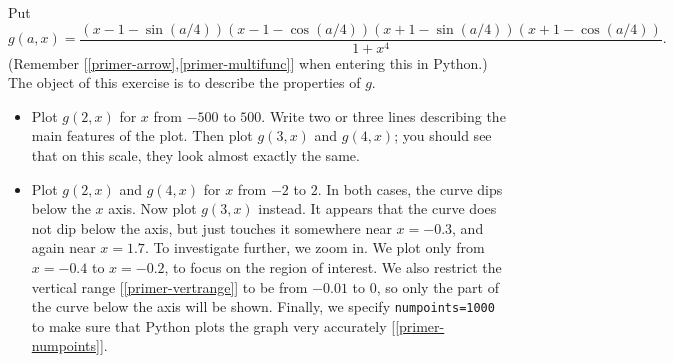 \documentclass[a4paper,10pt]{amsbook}
\begin{document}
\begin{exercise}\label{ex-quartic}
 Put 
 \[ g(a,x) =
    \frac { (x-1-\sin(a/4))(x-1-\cos(a/4))
            (x+1-\sin(a/4))(x+1-\cos(a/4))}
          {1+{x}^{4}}. 
 \]
 (Remember [\ref{primer-arrow},\ref{primer-multifunc}] when entering
 this in Python.)  The object of this exercise is to describe
 the properties of $g$.  
 \begin{itemize}
  \item[(a)] Plot $g(2,x)$ for $x$ from $-500$ to $500$.
   Write two or three lines describing the main features of
   the plot.  Then plot $g(3,x)$ and $g(4,x)$; you should see
   that on this scale, they look almost exactly the same.
  \item[(b)] Plot $g(2,x)$ and $g(4,x)$ for $x$ from $-2$ to $2$.  In
   both cases, the curve dips below the $x$ axis.  Now plot $g(3,x)$
   instead.  It appears that the curve does not dip below the axis,
   but just touches it somewhere near $x=-0.3$, and again near
   $x=1.7$.  To investigate further, we zoom in.  We plot only from
   $x=-0.4$ to $x=-0.2$, to focus on the region of interest.  We also
   restrict the vertical range [\ref{primer-vertrange}] to be
   from $-0.01$ to $0$, so only the part of the curve below
   the axis will be shown.  Finally, we specify
   \verb~numpoints=1000~ to make sure that Python plots the
   graph very accurately [\ref{primer-numpoints}].  


\end{itemize}
\end{exercise}
\end{document}
